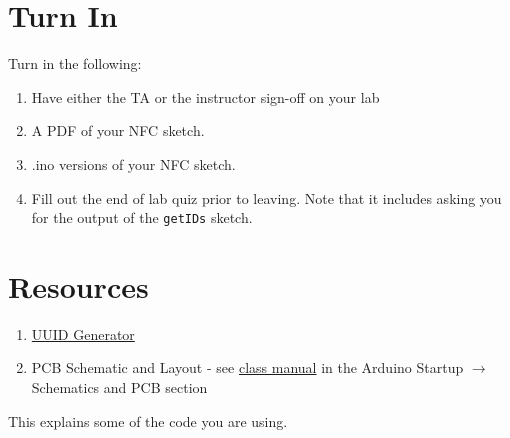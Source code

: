 \section{Turn In}
Turn in the following:
\begin{enumerate}
    \item Have either the TA or the instructor sign-off on your lab
    \item A PDF of your NFC sketch.
    \item .ino versions of your NFC sketch.
    \item Fill out the end of lab quiz prior to leaving. Note that it includes asking you 
            for the output of the \lstinline$getIDs$ sketch. 
\end{enumerate}

\section{Resources}\label{sec:wirelessresources}
\begin{enumerate}
    \item \href{https://www.uuidgenerator.net/}{UUID Generator} 
    \item PCB Schematic and Layout - see 
            \href{https://github.com/semcneil/Fundamentals-of-Microcontrollers-Manual}{class manual} 
            in the Arduino Startup $\rightarrow$ Schematics and PCB section
\end{enumerate}
This explains some of the code you are using.
